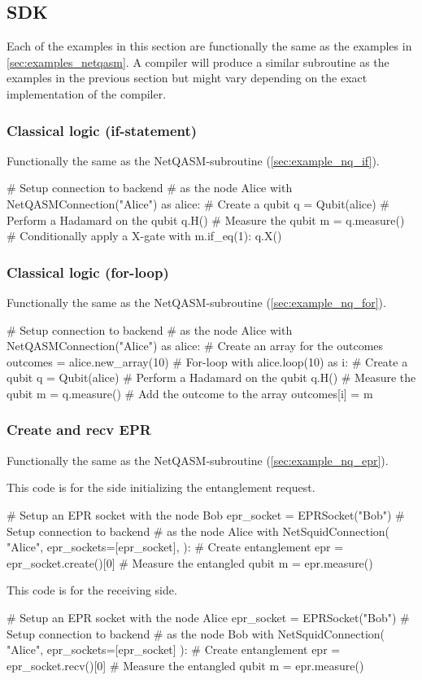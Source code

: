 \subsection{SDK}
\label{app:examples_sdk}
Each of the examples in this section are functionally the same as the examples in \cref{sec:examples_netqasm}.
A compiler will produce a similar subroutine as the examples in the previous section but might vary depending on the exact implementation of the compiler.


\subsubsection{Classical logic (if-statement)}
Functionally the same as the \ac{NetQASM}-subroutine (\cref{sec:example_nq_if}).
\begin{pycode}
# Setup connection to backend
# as the node Alice
with NetQASMConnection("Alice") as alice:
  # Create a qubit
  q = Qubit(alice)
  # Perform a Hadamard on the qubit
  q.H()
  # Measure the qubit
  m = q.measure()
  # Conditionally apply a X-gate
  with m.if_eq(1):
    q.X()
\end{pycode}

\subsubsection{Classical logic (for-loop)}
Functionally the same as the \ac{NetQASM}-subroutine (\cref{sec:example_nq_for}).
\begin{pycode}
# Setup connection to backend
# as the node Alice
with NetQASMConnection("Alice") as alice:
  # Create an array for the outcomes
  outcomes = alice.new_array(10)
  # For-loop
  with alice.loop(10) as i:
    # Create a qubit
    q = Qubit(alice)
    # Perform a Hadamard on the qubit
    q.H()
    # Measure the qubit
    m = q.measure()
    # Add the outcome to the array
    outcomes[i] = m
\end{pycode}

\subsubsection{Create and recv EPR}
Functionally the same as the \ac{NetQASM}-subroutine (\cref{sec:example_nq_epr}).

This code is for the side initializing the entanglement request.
\begin{pycode}
# Setup an EPR socket with the node Bob
epr_socket = EPRSocket("Bob")
# Setup connection to backend
# as the node Alice
with NetSquidConnection(
"Alice",
epr_sockets=[epr_socket],
):
  # Create entanglement
  epr = epr_socket.create()[0]
  # Measure the entangled qubit
  m = epr.measure()
\end{pycode}

This code is for the receiving side.
\begin{pycode}
# Setup an EPR socket with the node Alice
epr_socket = EPRSocket("Bob")
# Setup connection to backend
# as the node Bob
with NetSquidConnection(
"Alice",
epr_sockets=[epr_socket]
):
  # Create entanglement
  epr = epr_socket.recv()[0]
  # Measure the entangled qubit
  m = epr.measure()
\end{pycode}
